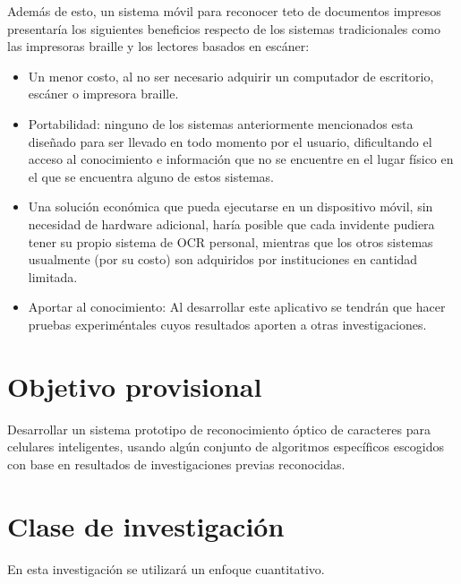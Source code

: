 \documentclass[a4paper, 11pt, oneside]{article}
\begin{document}
	Además de esto, un sistema móvil para reconocer teto de documentos impresos presentaría los siguientes beneficios respecto de los sistemas tradicionales como las impresoras braille y los lectores basados en escáner:
	\begin{itemize}
	\item Un menor costo, al no ser necesario adquirir un computador de escritorio, escáner o impresora braille.

	\item Portabilidad: ninguno de los sistemas anteriormente mencionados esta diseñado para ser llevado en todo momento por el usuario, dificultando el acceso al conocimiento e información que no se encuentre en el lugar físico en el que se encuentra alguno de estos sistemas.
	
	\item Una solución económica que pueda ejecutarse en un dispositivo móvil, sin necesidad de hardware adicional, haría posible que cada invidente pudiera tener su propio sistema de OCR personal, mientras que los otros sistemas usualmente (por su costo) son adquiridos por instituciones en cantidad limitada.

	\item Aportar al conocimiento: Al desarrollar este aplicativo se tendrán que hacer pruebas experiméntales cuyos resultados aporten a otras investigaciones.
	\end{itemize}
	\clearpage

	\section{Objetivo provisional}
	Desarrollar un sistema prototipo de reconocimiento óptico de caracteres para celulares inteligentes, usando algún conjunto de algoritmos específicos escogidos con base en resultados de investigaciones previas reconocidas.
	\clearpage
	\section{Clase de investigación}
	En esta investigación se utilizará un enfoque cuantitativo. 
	\clearpage
\end{document}
